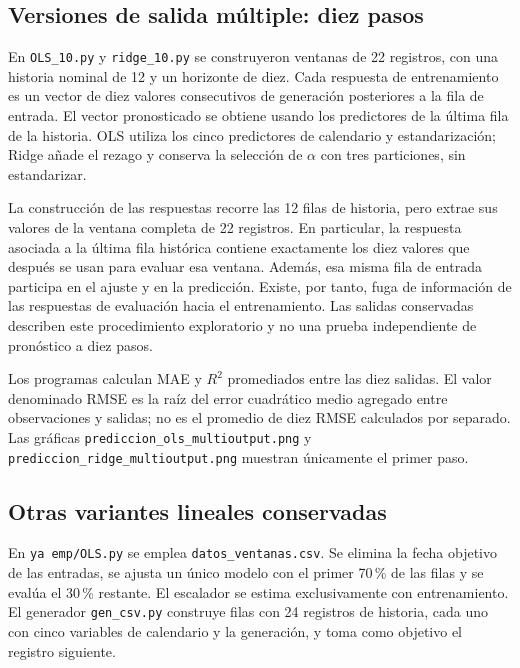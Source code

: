 \subsection{Versiones de salida múltiple: diez pasos}
\label{subsec:lineales-multi}

En \texttt{OLS\_10.py} y \texttt{ridge\_10.py} se construyeron ventanas de 22 registros, con una historia nominal de 12 y un horizonte de diez. Cada respuesta de entrenamiento es un vector de diez valores consecutivos de generación posteriores a la fila de entrada. El vector pronosticado se obtiene usando los predictores de la última fila de la historia. OLS utiliza los cinco predictores de calendario y estandarización; Ridge añade el rezago y conserva la selección de $\alpha$ con tres particiones, sin estandarizar.

La construcción de las respuestas recorre las 12 filas de historia, pero extrae sus valores de la ventana completa de 22 registros. En particular, la respuesta asociada a la última fila histórica contiene exactamente los diez valores que después se usan para evaluar esa ventana. Además, esa misma fila de entrada participa en el ajuste y en la predicción. Existe, por tanto, fuga de información de las respuestas de evaluación hacia el entrenamiento. Las salidas conservadas describen este procedimiento exploratorio y no una prueba independiente de pronóstico a diez pasos.

Los programas calculan MAE y $R^2$ promediados entre las diez salidas. El valor denominado RMSE es la raíz del error cuadrático medio agregado entre observaciones y salidas; no es el promedio de diez RMSE calculados por separado. Las gráficas \texttt{prediccion\_ols\_multioutput.png} y \texttt{prediccion\_ridge\_multioutput.png} muestran únicamente el primer paso.

\subsection{Otras variantes lineales conservadas}

En \texttt{ya emp/OLS.py} se emplea \texttt{datos\_ventanas.csv}. Se elimina la fecha objetivo de las entradas, se ajusta un único modelo con el primer 70\,\% de las filas y se evalúa el 30\,\% restante. El escalador se estima exclusivamente con entrenamiento. El generador \texttt{gen\_csv.py} construye filas con 24 registros de historia, cada uno con cinco variables de calendario y la generación, y toma como objetivo el registro siguiente.

